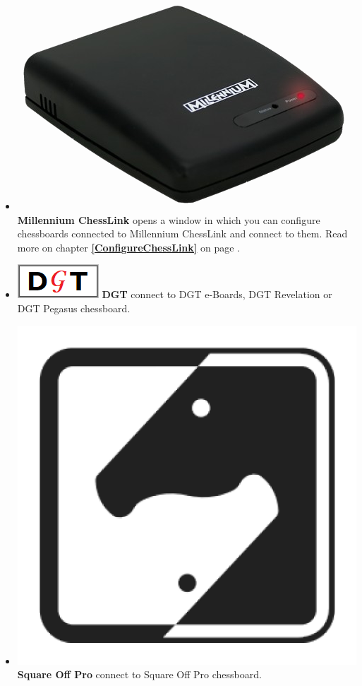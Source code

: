 \documentclass[11pt,a4paper]{article}
\begin{document}
\begin{itemize}
	\item  \includegraphics[scale=0.05]{Millennium ChessLink.png} \textbf{Millennium ChessLink} opens a window in which you can configure chessboards connected to Millennium ChessLink and connect to them.  Read more on chapter \textbf{\ref{ConfigureChessLink}  } on page \pageref{ConfigureChessLink}.
	\item  \includegraphics[scale=0.3]{dgt48.png} \textbf{DGT} connect to DGT e-Boards, DGT Revelation or DGT Pegasus chessboard.	
	\item  \includegraphics[scale=0.05]{squareoff.png} \textbf{Square Off Pro} connect to Square Off Pro chessboard.		

\end{itemize}
\end{document}
